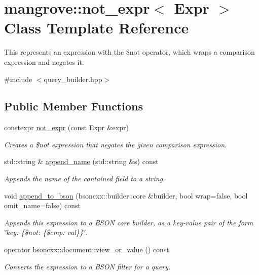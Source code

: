 \hypertarget{classmangrove_1_1not__expr}{}\section{mangrove\+:\+:not\+\_\+expr$<$ Expr $>$ Class Template Reference}
\label{classmangrove_1_1not__expr}


This represents an expression with the \$not operator, which wraps a comparison expression and negates it.  




{\ttfamily \#include $<$query\+\_\+builder.\+hpp$>$}

\subsection*{Public Member Functions}
\begin{DoxyCompactItemize}
\item 
constexpr \hyperlink{classmangrove_1_1not__expr_a5c6987d2c158a495d1cf0be8b620f276}{not\+\_\+expr} (const Expr \&expr)
\begin{DoxyCompactList}\small\item\em Creates a \$not expression that negates the given comparison expression. \end{DoxyCompactList}\item 
std\+::string \& \hyperlink{classmangrove_1_1not__expr_a5f6ac8b90ae4b2ac8910f8b77827b4e1}{append\+\_\+name} (std\+::string \&s) const \hypertarget{classmangrove_1_1not__expr_a5f6ac8b90ae4b2ac8910f8b77827b4e1}{}\label{classmangrove_1_1not__expr_a5f6ac8b90ae4b2ac8910f8b77827b4e1}

\begin{DoxyCompactList}\small\item\em Appends the name of the contained field to a string. \end{DoxyCompactList}\item 
void \hyperlink{classmangrove_1_1not__expr_a63c87ef45c94b5f4262167f11cd2db85}{append\+\_\+to\+\_\+bson} (bsoncxx\+::builder\+::core \&builder, bool wrap=false, bool omit\+\_\+name=false) const 
\begin{DoxyCompactList}\small\item\em Appends this expression to a B\+S\+ON core builder, as a key-\/value pair of the form \char`\"{}key\+: \{\$not\+: \{\$cmp\+: val\}\}\char`\"{}. \end{DoxyCompactList}\item 
\hyperlink{classmangrove_1_1not__expr_aedc395f227164db4bb018eba28bca79f}{operator bsoncxx\+::document\+::view\+\_\+or\+\_\+value} () const 
\begin{DoxyCompactList}\small\item\em Converts the expression to a B\+S\+ON filter for a query. \end{DoxyCompactList}\end{DoxyCompactItemize}


